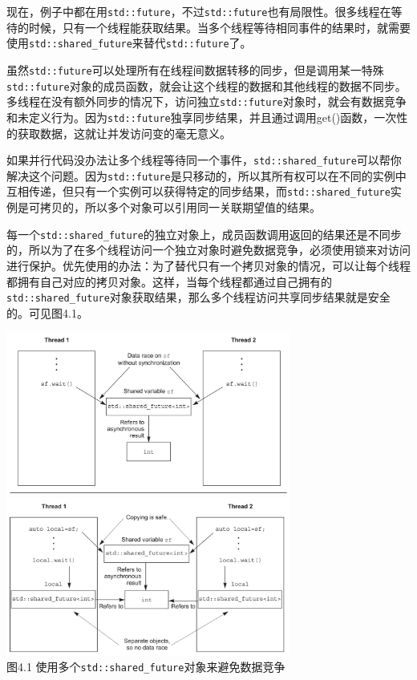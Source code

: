 现在，例子中都在用\texttt{std::future}，不过\texttt{std::future}也有局限性。很多线程在等待的时候，只有一个线程能获取结果。当多个线程等待相同事件的结果时，就需要使用\texttt{std::shared\_future}来替代\texttt{std::future}了。


虽然\texttt{std::future}可以处理所有在线程间数据转移的同步，但是调用某一特殊\texttt{std::future}对象的成员函数，就会让这个线程的数据和其他线程的数据不同步。多线程在没有额外同步的情况下，访问独立\texttt{std::future}对象时，就会有数据竞争和未定义行为。因为\texttt{std::future}独享同步结果，并且通过调用get()函数，一次性的获取数据，这就让并发访问变的毫无意义。

如果并行代码没办法让多个线程等待同一个事件，\texttt{std::shared\_future}可以帮你解决这个问题。因为\texttt{std::future}是只移动的，所以其所有权可以在不同的实例中互相传递，但只有一个实例可以获得特定的同步结果，而\texttt{std::shared\_future}实例是可拷贝的，所以多个对象可以引用同一关联期望值的结果。

每一个\texttt{std::shared\_future}的独立对象上，成员函数调用返回的结果还是不同步的，所以为了在多个线程访问一个独立对象时避免数据竞争，必须使用锁来对访问进行保护。优先使用的办法：为了替代只有一个拷贝对象的情况，可以让每个线程都拥有自己对应的拷贝对象。这样，当每个线程都通过自己拥有的\texttt{std::shared\_future}对象获取结果，那么多个线程访问共享同步结果就是安全的。可见图4.1。



\begin{center}
  \includegraphics[width=0.7\textwidth]{content/chapter04/images/4-1-1.png}\\
  \includegraphics[width=0.7\textwidth]{content/chapter04/images/4-1-2.png}\\
  图4.1 使用多个\texttt{std::shared\_future}对象来避免数据竞争
\end{center}

